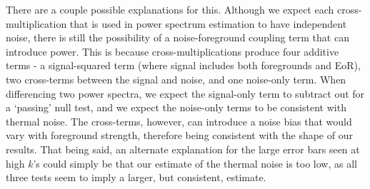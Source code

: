 \documentclass[preprint2,numberedappendix,tighten]{aastex6}  %
\begin{document}
There are a couple possible explanations for this. Although we expect each cross-multiplication that is used in power spectrum estimation to have independent noise, there is still the possibility of a noise-foreground coupling term that can introduce power. This is because cross-multiplications produce four additive terms - a signal-squared term (where signal includes both foregrounds and EoR), two cross-terms between the signal and noise, and one noise-only term. When differencing two power spectra, we expect the signal-only term to subtract out for a `passing' null test, and we expect the noise-only terms to be consistent with thermal noise. The cross-terms, however, can introduce a noise bias that would vary with foreground strength, therefore being consistent with the shape of our results. That being said, an alternate explanation for the large error bars seen at high $k$'s could simply be that our estimate of the thermal noise is too low, as all three tests seem to imply a larger, but consistent, estimate.



\end{document}
